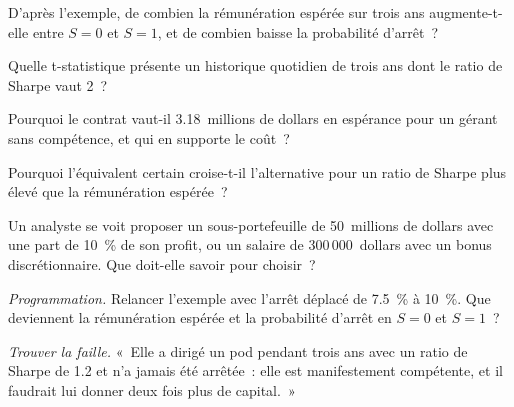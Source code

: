 \begin{exercise}[$\star$]\label{exo:in:portfolio-manager-and-pod-analyst:2}
D'après l'exemple, de combien la rémunération espérée sur trois ans augmente-t-elle entre $S=0$ et $S=1$, et de combien
baisse la probabilité d'arrêt~?
\end{exercise}

\begin{exercise}[$\star$]\label{exo:in:portfolio-manager-and-pod-analyst:3}
Quelle t-statistique présente un historique quotidien de trois ans dont le ratio de Sharpe vaut 2~?
\end{exercise}

\begin{exercise}[$\star\star$]\label{exo:in:portfolio-manager-and-pod-analyst:4}
Pourquoi le contrat vaut-il 3.18~millions de dollars en espérance pour un gérant sans compétence, et qui en supporte le coût~?
\end{exercise}

\begin{exercise}[$\star\star$]\label{exo:in:portfolio-manager-and-pod-analyst:5}
Pourquoi l'équivalent certain croise-t-il l'alternative pour un ratio de Sharpe plus élevé que la rémunération espérée~?
\end{exercise}

\begin{exercise}[$\star\star$]\label{exo:in:portfolio-manager-and-pod-analyst:6}
Un analyste se voit proposer un sous-portefeuille de 50~millions de dollars avec une part de 10~\% de son profit, ou un salaire de 300\,000~dollars avec un
bonus discrétionnaire. Que doit-elle savoir pour choisir~?
\end{exercise}

\begin{exercise}[$\star\star\star$]\label{exo:in:portfolio-manager-and-pod-analyst:7}
\emph{Programmation.} Relancer l'exemple avec l'arrêt déplacé de 7.5~\% à 10~\%. Que deviennent la rémunération espérée et la
probabilité d'arrêt en $S=0$ et $S=1$~?
\end{exercise}

\begin{exercise}[$\star\star\star$]\label{exo:in:portfolio-manager-and-pod-analyst:8}
\emph{Trouver la faille.} «~Elle a dirigé un pod pendant trois ans avec un ratio de Sharpe de 1.2 et n'a jamais été arrêtée~: elle est manifestement
compétente, et il faudrait lui donner deux fois plus de capital.~»
\end{exercise}

